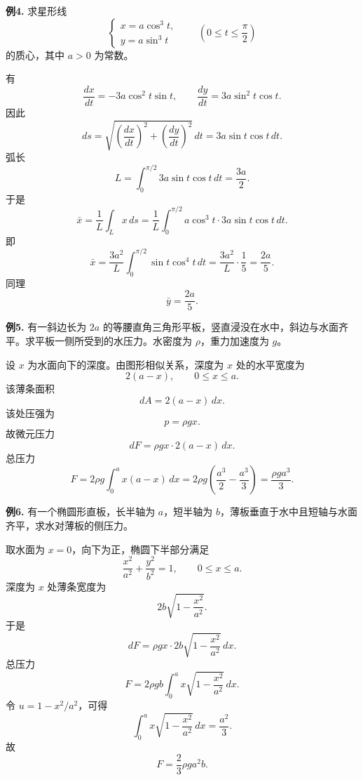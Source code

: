 \begin{problemblock}
\textbf{例4.} 求星形线
\[
\begin{cases}
x=a\cos^3t,\\
y=a\sin^3t
\end{cases}
\qquad \left(0\le t\le\frac{\pi}{2}\right)
\]
的质心，其中 \(a>0\) 为常数。
\end{problemblock}
\begin{solutionblock}
有
\[
\frac{dx}{dt}=-3a\cos^2t\sin t,\qquad
\frac{dy}{dt}=3a\sin^2t\cos t.
\]
因此
\[
ds=\sqrt{\left(\frac{dx}{dt}\right)^2+\left(\frac{dy}{dt}\right)^2}\,dt
=3a\sin t\cos t\,dt.
\]
弧长
\[
L=\int_0^{\pi/2}3a\sin t\cos t\,dt=\frac{3a}{2}.
\]
于是
\[
\bar x=\frac1L\int_L x\,ds
=\frac{1}{L}\int_0^{\pi/2}a\cos^3t\cdot3a\sin t\cos t\,dt.
\]
即
\[
\bar x=\frac{3a^2}{L}\int_0^{\pi/2}\sin t\cos^4t\,dt
=\frac{3a^2}{L}\cdot\frac15
=\frac{2a}{5}.
\]
同理
\[
\bar y=\frac{2a}{5}.
\]
\end{solutionblock}

\begin{problemblock}
\textbf{例5.} 有一斜边长为 \(2a\) 的等腰直角三角形平板，竖直浸没在水中，斜边与水面齐平。求平板一侧所受到的水压力。水密度为 \(\rho\)，重力加速度为 \(g\)。
\end{problemblock}
\begin{solutionblock}
设 \(x\) 为水面向下的深度。由图形相似关系，深度为 \(x\) 处的水平宽度为
\[
2(a-x),\qquad 0\le x\le a.
\]
该薄条面积
\[
dA=2(a-x)\,dx.
\]
该处压强为
\[
p=\rho gx.
\]
故微元压力
\[
dF=\rho gx\cdot2(a-x)\,dx.
\]
总压力
\[
F=2\rho g\int_0^a x(a-x)\,dx
=2\rho g\left(\frac{a^3}{2}-\frac{a^3}{3}\right)
=\frac{\rho ga^3}{3}.
\]
\end{solutionblock}

\begin{problemblock}
\textbf{例6.} 有一个椭圆形直板，长半轴为 \(a\)，短半轴为 \(b\)，薄板垂直于水中且短轴与水面齐平，求水对薄板的侧压力。
\end{problemblock}
\begin{solutionblock}
取水面为 \(x=0\)，向下为正，椭圆下半部分满足
\[
\frac{x^2}{a^2}+\frac{y^2}{b^2}=1,\qquad 0\le x\le a.
\]
深度为 \(x\) 处薄条宽度为
\[
2b\sqrt{1-\frac{x^2}{a^2}}.
\]
于是
\[
dF=\rho gx\cdot2b\sqrt{1-\frac{x^2}{a^2}}\,dx.
\]
总压力
\[
F=2\rho gb\int_0^a x\sqrt{1-\frac{x^2}{a^2}}\,dx.
\]
令 \(u=1-x^2/a^2\)，可得
\[
\int_0^a x\sqrt{1-\frac{x^2}{a^2}}\,dx=\frac{a^2}{3}.
\]
故
\[
F=\frac{2}{3}\rho ga^2b.
\]
\end{solutionblock}

